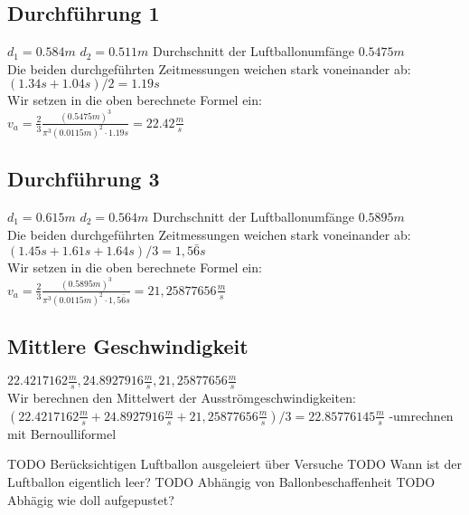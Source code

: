 \documentclass{article}
\begin{document}
    \subsection{Durchführung 1}
    \(d_1 = 0.584 m\) \(d_2 = 0.511 m\) Durchschnitt der Luftballonumfänge \(0.5475m\) \\
    Die beiden durchgeführten Zeitmessungen weichen stark voneinander ab: \\
    \( (1.34s + 1.04s)/2 = 1.19s \) \\
    Wir setzen in die oben berechnete Formel ein: \\
    \( v_a = \frac{2}{3} \frac{{(0.5475m)}^3}{\pi^3 {(0.0115m )}^2 \cdot 1.19s} = 22.42 \frac{m}{s}\)

    \subsection{Durchführung 3}
    \(d_1 = 0.615 m\) \(d_2 = 0.564 m\) Durchschnitt der Luftballonumfänge \(0.5895m\) \\
    Die beiden durchgeführten Zeitmessungen weichen stark voneinander ab: \\
    \( (1.45s + 1.61s + 1.64s )/3 = 1,5\bar{6}s \) \\
    Wir setzen in die oben berechnete Formel ein: \\
    \( v_a = \frac{2}{3} \frac{{(0.5895m)}^3}{\pi^3 {(0.0115m )}^2 \cdot 1,5\bar{6}s} = 21,25877656 \frac{m}{s}\)

    \subsection{Mittlere Geschwindigkeit}
    \( 22.4217162 \frac{m}{s}, 24.8927916 \frac{m}{s}, 21,25877656 \frac{m}{s} \) \\
    Wir berechnen den Mittelwert der Ausströmgeschwindigkeiten:
    \(( 22.4217162 \frac{m}{s} + 24.8927916 \frac{m}{s} + 21,25877656 \frac{m}{s} )/3 = 22.85776145 \frac{m}{s}\)
    -umrechnen mit Bernoulliformel

    TODO Berücksichtigen Luftballon ausgeleiert über Versuche
    TODO Wann ist der Luftballon eigentlich leer?
    TODO Abhängig von Ballonbeschaffenheit
    TODO Abhägig wie doll aufgepustet?
\end{document}
